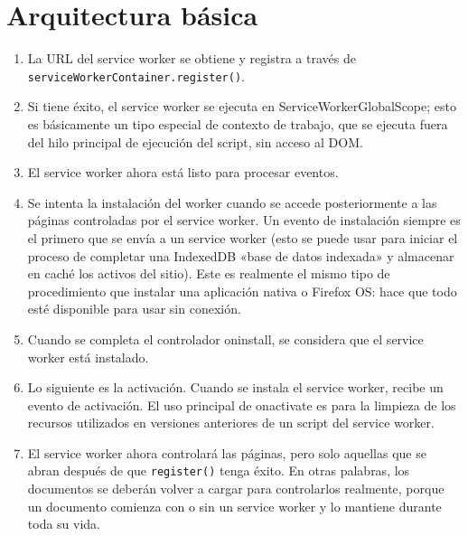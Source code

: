 \documentclass{article}
\begin{document}
\section{Arquitectura básica}
\begin{enumerate}
    \item La URL del service worker se obtiene y registra a través de \texttt{serviceWorkerContainer.register()}.
    \item Si tiene éxito, el service worker se ejecuta en ServiceWorkerGlobalScope; esto es básicamente un tipo especial de contexto de trabajo, que se ejecuta fuera del hilo principal de ejecución del script, sin acceso al DOM.
    \item El service worker ahora está listo para procesar eventos.
    \item Se intenta la instalación del worker cuando se accede posteriormente a las páginas controladas por el service worker. Un evento de instalación siempre es el primero que se envía a un service worker (esto se puede usar para iniciar el proceso de completar una IndexedDB «base de datos indexada» y almacenar en caché los activos del sitio). Este es realmente el mismo tipo de procedimiento que instalar una aplicación nativa o Firefox OS: hace que todo esté disponible para usar sin conexión.
    \item Cuando se completa el controlador oninstall, se considera que el service worker está instalado.
    \item Lo siguiente es la activación. Cuando se instala el service worker, recibe un evento de activación. El uso principal de onactivate es para la limpieza de los recursos utilizados en versiones anteriores de un script del service worker.
    \item El service worker ahora controlará las páginas, pero solo aquellas que se abran después de que \texttt{register()} tenga éxito. En otras palabras, los documentos se deberán volver a cargar para controlarlos realmente, porque un documento comienza con o sin un service worker y lo mantiene durante toda su vida.
\end{enumerate}
\end{document}
